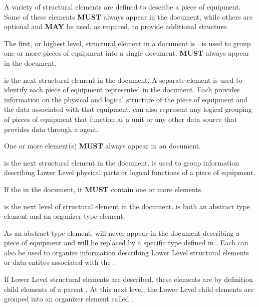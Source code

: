 \FloatBarrier


A variety of \glspl{structural element} are defined to describe a piece of equipment.  Some of these elements \textbf{MUST} always appear in the  document, while others are optional and \textbf{MAY} be used, as required, to provide additional structure.

The first, or highest level, \gls{structural element} in a  document is .  is used to group one or more pieces of equipment into a single document.   \textbf{MUST} always appear in the  document.

 is the next \gls{structural element} in the  document. A separate  element is used to identify each piece of equipment represented in the  document. Each  provides information on the physical and logical structure of the piece of equipment and the data associated with that equipment.  can also represent any logical grouping of pieces of equipment that function as a unit or any other data source that provides data through a \gls{agent}.

One or more  element(s) \textbf{MUST} always appear in an  document.

 is the next \gls{structural element} in the  document.  is used to group information describing \gls{Lower Level} physical parts or logical functions of a piece of equipment.

If the  in the document, it \textbf{MUST} contain one or more  elements.

 is the next level of \gls{structural element} in the  document.  is both an abstract type element and an \gls{organizer} type element. 

As an abstract type element,  will never appear in the document describing a piece of equipment and will be replaced by a specific  type defined in . Each  can also be used to organize information describing \gls{Lower Level} \glspl{structural element} or \glspl{data entity} associated with the .

If \gls{Lower Level} \glspl{structural element} are described, these elements are by definition child  elements of a parent . At this next level, the \gls{Lower Level} child  elements are grouped into an \gls{organizer} element called .
 
